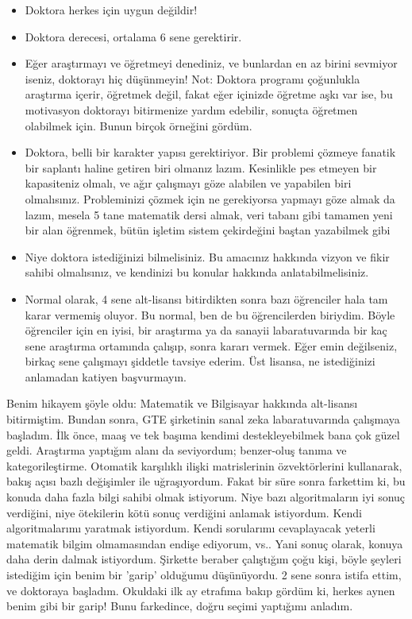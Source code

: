 \documentclass[12pt,fleqn]{article}\usepackage{../../common}
\begin{document}
\begin{itemize}
   \item Doktora herkes için uygun değildir!
   \item Doktora derecesi, ortalama 6 sene gerektirir.
   \item Eğer araştırmayı ve öğretmeyi denediniz, ve bunlardan en az birini
     sevmiyor iseniz, doktorayı hiç düşünmeyin! Not: Doktora programı
     çoğunlukla araştırma içerir, öğretmek değil, fakat eğer içinizde
     öğretme aşkı var ise, bu motivasyon doktorayı bitirmenize yardım
     edebilir, sonuçta öğretmen olabilmek için. Bunun birçok örneğini
     gördüm.
   \item Doktora, belli bir karakter yapısı gerektiriyor. Bir problemi
     çözmeye fanatik bir saplantı haline getiren biri olmanız
     lazım. Kesinlikle pes etmeyen bir kapasiteniz olmalı, ve ağır çalışmayı
     göze alabilen ve yapabilen biri olmalısınız. Probleminizi çözmek için ne
     gerekiyorsa yapmayı göze almak da lazım, mesela 5 tane matematik dersi
     almak, veri tabanı gibi tamamen yeni bir alan öğrenmek, bütün işletim
     sistem çekirdeğini baştan yazabilmek gibi
   \item Niye doktora istediğinizi bilmelisiniz. Bu amacınız hakkında
     vizyon ve fikir sahibi olmalısınız, ve kendinizi bu konular hakkında
     anlatabilmelisiniz.
   \item Normal olarak, 4 sene alt-lisansı bitirdikten sonra bazı
     öğrenciler hala tam karar vermemiş oluyor. Bu normal, ben de bu
     öğrencilerden biriydim. Böyle öğrenciler için en iyisi, bir araştırma
     ya da sanayii labaratuvarında bir kaç sene araştırma ortamında
     çalışıp, sonra kararı vermek. Eğer emin değilseniz, birkaç sene
     çalışmayı şiddetle tavsiye ederim. Üst lisansa, ne istediğinizi
     anlamadan katiyen başvurmayın.
\end{itemize}

Benim hikayem şöyle oldu: Matematik ve Bilgisayar hakkında alt-lisansı
bitirmiştim. Bundan sonra, GTE şirketinin sanal zeka labaratuvarında
çalışmaya başladım. İlk önce, maaş ve tek başıma kendimi destekleyebilmek
bana çok güzel geldi. Araştırma yaptığım alanı da seviyordum; benzer-oluş
tanıma ve kategorileştirme. Otomatik karşılıklı ilişki matrislerinin
özvektörlerini kullanarak, bakış açısı bazlı değişimler ile
uğraşıyordum. Fakat bir süre sonra farkettim ki, bu konuda daha fazla bilgi
sahibi olmak istiyorum. Niye bazı algoritmaların iyi sonuç verdiğini, niye
ötekilerin kötü sonuç verdiğini anlamak istiyordum. Kendi algoritmalarımı
yaratmak istiyordum. Kendi sorularımı cevaplayacak yeterli matematik bilgim
olmamasından endişe ediyorum, vs.. Yani sonuç olarak, konuya daha derin
dalmak istiyordum. Şirkette beraber çalıştığım çoğu kişi, böyle şeyleri
istediğim için benim bir 'garip' olduğumu düşünüyordu. 2 sene sonra istifa
ettim, ve doktoraya başladım. Okuldaki ilk ay etrafıma bakıp gördüm ki,
herkes aynen benim gibi bir garip! Bunu farkedince, doğru seçimi yaptığımı
anladım.
\end{document}
